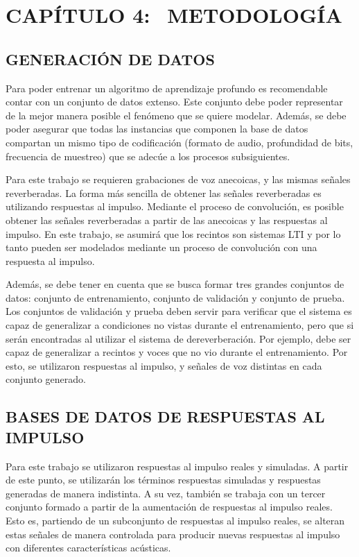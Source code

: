 \section[Metodología]{CAPÍTULO 4:$\ \ \ \ $METODOLOGÍA} 

\subsection[Análisis de datos]{GENERACIÓN DE DATOS}
Para poder entrenar un algoritmo de aprendizaje profundo es recomendable contar con un conjunto de datos extenso. Este conjunto debe poder representar de la mejor manera posible el fenómeno que se quiere modelar. Además, se debe poder asegurar que todas las instancias que componen la base de datos compartan un mismo tipo de codificación (formato de audio, profundidad de bits, frecuencia de muestreo) que se adecúe a los procesos subsiguientes. 

Para este trabajo se requieren grabaciones de voz anecoicas, y las mismas señales reverberadas. La forma más sencilla de obtener las señales reverberadas es utilizando respuestas al impulso. Mediante el proceso de convolución, es posible obtener las señales reverberadas a partir de las anecoicas y las respuestas al impulso. En este trabajo, se asumirá que los recintos son sistemas LTI y por lo tanto pueden ser modelados mediante un proceso de convolución con una respuesta al impulso.

Además, se debe tener en cuenta que se busca formar tres grandes conjuntos de datos: conjunto de entrenamiento, conjunto de validación y conjunto de prueba. Los conjuntos de validación y prueba deben servir para verificar que el sistema es capaz de generalizar a condiciones no vistas durante el entrenamiento, pero que si serán encontradas al utilizar el sistema de dereverberación. Por ejemplo, debe ser capaz de generalizar a recintos y voces que no vio durante el entrenamiento. Por esto, se utilizaron respuestas al impulso, y señales de voz distintas en cada conjunto generado.   


\subsection[Base de datos de respuestas al impulso]{BASES DE DATOS DE RESPUESTAS AL IMPULSO}

Para este trabajo se utilizaron respuestas al impulso reales y simuladas. A partir de este punto, se utilizarán los términos respuestas simuladas y respuestas generadas de manera indistinta. A su vez, también se trabaja con un tercer conjunto formado a partir de la aumentación de respuestas al impulso reales. Esto es, partiendo de un subconjunto de respuestas al impulso reales, se alteran estas señales de manera controlada para producir nuevas respuestas al impulso con diferentes características acústicas.

